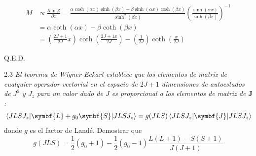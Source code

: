 \documentclass{tufte-book}
\begin{document}
\begin{align*}
M&\propto \frac{\partial\ln Z}{\partial x}=\frac{\alpha\cosh(\alpha x)\sinh(\beta x)-\beta\sinh(\alpha x)\cosh(\beta x)}{\sinh^2(\beta x)}\left(\frac{\sinh(\alpha x)}{\sinh(\beta x)}\right)^{-1}\\
&=\alpha \coth(\alpha x)-\beta \coth(\beta x)\\
&=\left( \frac{2J+1}{2J}x \right) \coth \left(\frac{2J+1 x}{2J}\right)-\left( \frac{1}{2J}\right) \coth\left( \frac{x}{2J} \right)
\end{align*}

Q.E.D.

\begin{tcolorbox}[halign=left]
  \lettrine[lines=2]{\color{ExerciseNumberColor}2.3}{}
  \emph{El teorema de Wigner-Eckart establece que los elementos de
    matriz de cualquier operador vectorial en el espacio de $2J+1$
    dimensiones de autoestados de $J^2$ y $J_z$ para un valor dado de
    $J$ es proporcional a los elementos de matriz de $\symbf{J}$:}
  \begin{equation*}
    \mel{JLSJ_z}{\symbf{L}+g_0 \symbf{S}}{JLSJ_z} = g(JLS)
\mel{JLSJ_z}{\symbf{J}}{JLSJ_z}
  \end{equation*}
  donde $g$ es el factor de Landé. Demostrar que
  \begin{equation*}
    g(JLS)  = \frac{1}{2}(g_0+1) - \frac{1}{2} (g_0 -1) \frac{L(L+1) -
    S(S+1)}{J(J+1)}
  \end{equation*}
\end{tcolorbox}
\end{document}
